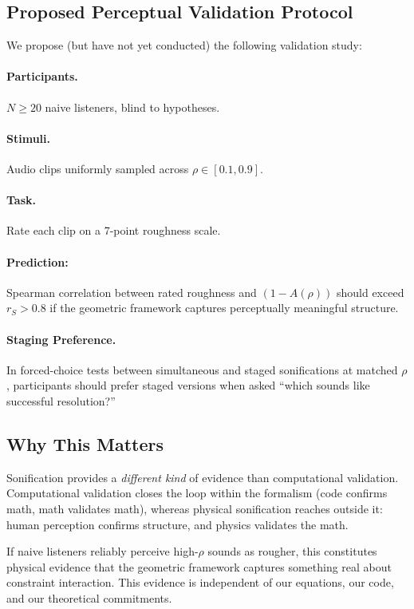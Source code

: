 \documentclass{article}
\theoremstyle{plain}
\theoremstyle{definition}
\theoremstyle{remark}
\begin{document}
\subsection{Proposed Perceptual Validation Protocol}

We propose (but have not yet conducted) the following validation study:

\paragraph{Participants.} $N \geq 20$ naive listeners, blind to hypotheses.

\paragraph{Stimuli.} Audio clips uniformly sampled across $\rho \in [0.1, 0.9]$.

\paragraph{Task.} Rate each clip on a 7-point roughness scale.

\paragraph{Prediction:} Spearman correlation between rated roughness and $(1-A(\rho))$ should exceed $r_S > 0.8$ if the geometric framework captures perceptually meaningful structure.

\paragraph{Staging Preference.} In forced-choice tests between simultaneous and staged sonifications at matched $\rho$, participants should prefer staged versions when asked ``which sounds like successful resolution?''

\subsection{Why This Matters}

Sonification provides a \emph{different kind} of evidence than computational validation. Computational validation closes the loop within the formalism (code confirms math, math validates math), whereas physical sonification reaches outside it: human perception confirms structure, and physics validates the math.

If naive listeners reliably perceive high-$\rho$ sounds as rougher, this constitutes physical evidence that the geometric framework captures something real about constraint interaction. This evidence is independent of our equations, our code, and our theoretical commitments.
\end{document}
